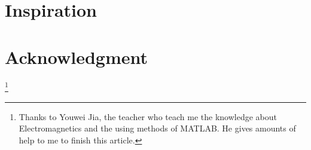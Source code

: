 \documentclass[10pt, journal, final]{IEEEtran}
\begin{document}
\section{
  Inspiration
 }
\label{sec: Ins}



\section*{Acknowledgment}
\thanks{
    Thanks to Youwei Jia, the teacher who teach me the knowledge about Electromagnetics
    and the using methods of MATLAB. He gives amounts of help to me to finish this article.
}
\end{document}
